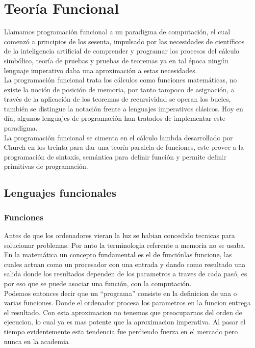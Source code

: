 
\chapter{Teoría Funcional}

Llamamos programación funcional a un paradigma de computación, el cual comenzó a principios de los sesenta, impulsado por las necesidades de científicos de la inteligencia artificial de comprender y programar los procesos del cálculo simbólico, teoría de pruebas y pruebas de teoremas ya en tal época ningún lenguaje imperativo daba una aproximación a estas necesidades.\\
La programación funcional trata los cálculos como funciones matemáticas, no existe la noción de posición de memoria, por tanto tampoco de asignación, a través de la aplicación de los teoremas de recursividad se operan los bucles, también se distingue la notación frente a lenguajes imperativos clásicos. Hoy en día, algunos lenguajes de programación han tratados de implementar este paradigma.\\
La programación funcional se cimenta en el cálculo lambda desarrollado por Church en los treinta para dar una teoría paralela de funciones, este provee a la programación de sintaxis, semántica para definir función y permite definir primitivas de programación.

\section{Lenguajes funcionales}

\subsection{Funciones}

Antes de que los ordenadores vieran la luz se habian concedido tecnicas para solucionar problemas. Por anto la terminologia referente a memoria no se usaba. En la matemática un concepto fundamental  es el de funciónlas funcione, las cuales actuan como un procesador con una entrada y dando como resultado una salida donde los resultados dependen de los parametros a traves de cada pasó, es por eso que se puede asociar una función, con la computación.\\

Podemos entonces decir que un ``programa'' consiste en la definicion de una o varias funciones. Donde el ordenador procesa los parametros en la funcion  entrega el resultado. Con esta aproximacion no tenemos que preocuparnos del orden de ejecucion, lo cual ya es mas potente que la aproximacion imperativa.
Al pasar el tiempo evidentemente esta tendencia fue perdiendo fuerza en el mercado pero nunca en la academia 

